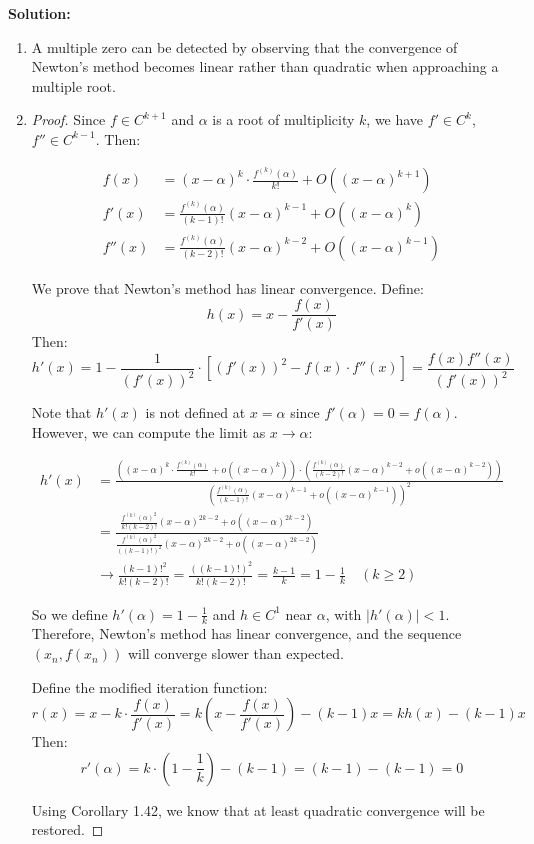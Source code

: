 \documentclass[a4paper]{article}
\begin{document}
\textbf{Solution:}
\begin{enumerate}[label=(\alph*)]
    \item A multiple zero can be detected by observing that the convergence of Newton's method becomes linear rather than quadratic when approaching a multiple root.
    
    \item \begin{proof}
    Since $f \in C^{k+1}$ and $\alpha$ is a root of multiplicity $k$, we have $f' \in C^k$, $f'' \in C^{k-1}$. Then:
    
    \begin{align*}
    f(x) &= (x-\alpha)^k \cdot \frac{f^{(k)}(\alpha)}{k!} + O\left((x-\alpha)^{k+1}\right) \\
    f'(x) &= \frac{f^{(k)}(\alpha)}{(k-1)!} (x-\alpha)^{k-1} + O\left((x-\alpha)^k\right) \\
    f''(x) &= \frac{f^{(k)}(\alpha)}{(k-2)!} (x-\alpha)^{k-2} + O\left((x-\alpha)^{k-1}\right)
    \end{align*}
    
    We prove that Newton's method has linear convergence. Define:
    \[
    h(x) = x - \frac{f(x)}{f'(x)}
    \]
    Then:
    \[
    h'(x) = 1 - \frac{1}{(f'(x))^2} \cdot \left[(f'(x))^2 - f(x) \cdot f''(x)\right] = \frac{f(x) f''(x)}{(f'(x))^2}
    \]
    
    Note that $h'(x)$ is not defined at $x = \alpha$ since $f'(\alpha) = 0 = f(\alpha)$. However, we can compute the limit as $x \to \alpha$:
    
    \begin{align*}
    h'(x) &= \frac{\left((x-\alpha)^k \cdot \frac{f^{(k)}(\alpha)}{k!} + o((x-\alpha)^k)\right) \cdot \left(\frac{f^{(k)}(\alpha)}{(k-2)!} (x-\alpha)^{k-2} + o((x-\alpha)^{k-2})\right)}{\left(\frac{f^{(k)}(\alpha)}{(k-1)!} (x-\alpha)^{k-1} + o((x-\alpha)^{k-1})\right)^2} \\
    &= \frac{\frac{f^{(k)}(\alpha)^2}{k!(k-2)!} (x-\alpha)^{2k-2} + o((x-\alpha)^{2k-2})}{\frac{f^{(k)}(\alpha)^2}{((k-1)!)^2} (x-\alpha)^{2k-2} + o((x-\alpha)^{2k-2})} \\
    &\to \frac{(k-1)!^2}{k!(k-2)!} = \frac{((k-1)!)^2}{k!(k-2)!} = \frac{k-1}{k} = 1 - \frac{1}{k} \quad (k \geq 2)
    \end{align*}
    
    So we define $h'(\alpha) = 1 - \frac{1}{k}$ and $h \in C^1$ near $\alpha$, with $|h'(\alpha)| < 1$. Therefore, Newton's method has linear convergence, and the sequence $(x_n, f(x_n))$ will converge slower than expected.
    
    Define the modified iteration function:
    \[
    r(x) = x - k \cdot \frac{f(x)}{f'(x)} = k\left(x - \frac{f(x)}{f'(x)}\right) - (k-1)x = k h(x) - (k-1)x
    \]
    Then:
    \[
    r'(\alpha) = k \cdot \left(1 - \frac{1}{k}\right) - (k-1) = (k-1) - (k-1) = 0
    \]
    
    Using Corollary 1.42\cite{ZQH_NPDE2025}, we know that at least quadratic convergence will be restored.
    \end{proof}
\end{enumerate}


\end{document}
